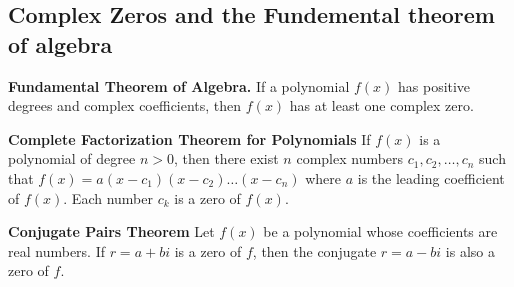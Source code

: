 \documentclass{report}
\begin{document}
    \pagebreak \bigbreak \noindent
    \subsection{Complex Zeros and the Fundemental theorem of algebra}
    \bigbreak \noindent 
    \begin{mdframed}
      \textbf{Fundamental Theorem of Algebra.}
      \bigbreak \noindent 
      If a polynomial $f(x)$ has positive degrees and complex coefficients, then $f(x)$ has at least one complex zero.
    \end{mdframed}
    \bigbreak \noindent 
    \begin{mdframed}
      \textbf{Complete Factorization Theorem for Polynomials}
      \bigbreak \noindent 
      If $f(x)$ is a polynomial of degree $n>0$, then there exist $n$ complex numbers $c_1, c_2, \dots, c_n$ such that $f(x) = a(x-c_1)(x-c_2)\dots(x-c_n)$ where $a$ is the leading coefficient of $f(x)$. Each number $c_k$ is a zero of $f(x)$.
    \end{mdframed}

    \bigbreak \noindent 
    \begin{mdframed}
      \textbf{Conjugate Pairs Theorem}
      \bigbreak \noindent 
      Let $f(x)$ be a polynomial whose coefficients are real numbers. If $r=a+bi$ is a zero of $f$, then the conjugate $r=a-bi$ is also a zero of $f$.
    \end{mdframed}
    \bigbreak \noindent 
    \bigbreak \noindent 
\end{document}
